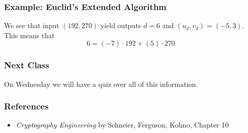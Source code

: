 \documentclass{beamer}
\newcommand{\<}{\langle}
\renewcommand{\>}{\rangle}
\begin{document}
\begin{frame}
\frametitle{Example: Euclid's Extended Algorithm}

We see that input $(192, 270)$ yield outputs $d=6$ and $(u_d, v_d) = (-5, 3)$. This means that
\[
6 = (-7)\cdot 192 + (5) \cdot 270
\]
\end{frame}


\begin{frame}
\frametitle{Next Class}

On Wednesday we will have a quiz over all of this information.
\end{frame}
\begin{frame}
\frametitle{References}

\begin{itemize}
\item \emph{Cryptography Engineering} by Schneier, Ferguson, Kohno, Chapter 10
\end{itemize}
\end{frame}
\end{document}
